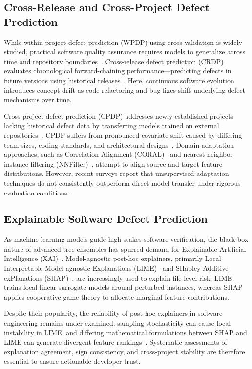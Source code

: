 \documentclass[conference]{IEEEtran}
\begin{document}
\subsection{Cross-Release and Cross-Project Defect Prediction}
While within-project defect prediction (WPDP) using cross-validation is widely studied, practical software quality assurance requires models to generalize across time and repository boundaries~\cite{sottomayor2024survey, turhan2009crosscompany}. Cross-release defect prediction (CRDP) evaluates chronological forward-chaining performance—predicting defects in future versions using historical releases~\cite{yatish2019affected}. Here, continuous software evolution introduces concept drift as code refactoring and bug fixes shift underlying defect mechanisms over time.

Cross-project defect prediction (CPDP) addresses newly established projects lacking historical defect data by transferring models trained on external repositories~\cite{turhan2009crosscompany}. CPDP suffers from pronounced covariate shift caused by differing team sizes, coding standards, and architectural designs~\cite{sottomayor2024survey}. Domain adaptation approaches, such as Correlation Alignment (CORAL)~\cite{sun2016coral} and nearest-neighbor instance filtering (NNFilter)~\cite{turhan2009crosscompany}, attempt to align source and target feature distributions. However, recent surveys report that unsupervised adaptation techniques do not consistently outperform direct model transfer under rigorous evaluation conditions~\cite{sottomayor2024survey}.

\subsection{Explainable Software Defect Prediction}
As machine learning models guide high-stakes software verification, the black-box nature of advanced tree ensembles has spurred demand for Explainable Artificial Intelligence (XAI)~\cite{haldar2024interpretable}. Model-agnostic post-hoc explainers, primarily Local Interpretable Model-agnostic Explanations (LIME)~\cite{ribeiro2016lime} and SHapley Additive exPlanations (SHAP)~\cite{lundberg2017shap}, are increasingly used to explain file-level risk. LIME trains local linear surrogate models around perturbed instances, whereas SHAP applies cooperative game theory to allocate marginal feature contributions. 

Despite their popularity, the reliability of post-hoc explainers in software engineering remains under-examined: sampling stochasticity can cause local instability in LIME, and differing mathematical formulations between SHAP and LIME can generate divergent feature rankings~\cite{haldar2024interpretable}. Systematic assessments of explanation agreement, sign consistency, and cross-project stability are therefore essential to ensure actionable developer trust.
\end{document}
